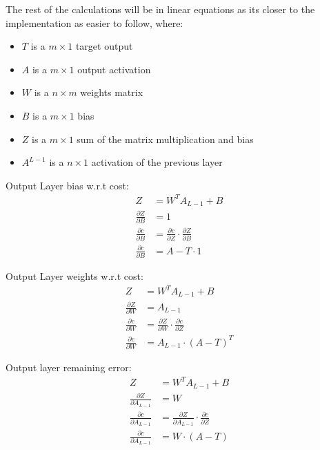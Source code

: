 The rest of the calculations will be in linear equations as its closer to the
implementation as easier to follow, where:
\begin{itemize}
    \item \( T \) is a \( m \times 1 \) target output
    \item \( A \) is a  \( m \times 1 \) output activation
    \item \( W \) is a \( n \times m \) weights matrix
    \item \( B \) is a \( m \times 1 \) bias
    \item \( Z \) is a \( m \times 1 \) sum of the matrix multiplication and bias
    \item \(A^{L-1} \) is a \( n \times 1 \) activation of the previous layer
\end{itemize}

Output Layer bias w.r.t cost:
\begin{equation}
    \begin{aligned}
        Z &= W^{T}A_{L-1} + B\\
        \frac{\partial Z}{\partial B} &= 1\\[2em]
        \frac{\partial c}{\partial B} &= \frac{\partial c}{\partial Z} \cdot \frac{\partial Z}{\partial B}\\
        \frac{\partial c}{\partial B} &= A - T \cdot 1
    \end{aligned}
\end{equation}

Output Layer weights w.r.t cost:
\begin{equation}
    \begin{aligned}
        Z &= W^{T}A_{L-1} + B\\
        \frac{\partial Z}{\partial W} &= A_{L-1}\\[2em]
        \frac{\partial c}{\partial W} &= \frac{\partial Z}{\partial W} \cdot \frac{\partial c}{\partial Z} \\
        \frac{\partial c}{\partial W} &= A_{L-1} \cdot (A - T)^{T}
    \end{aligned}
\end{equation}

Output layer remaining error:
\begin{equation}
    \begin{aligned}
        Z &= W^{T}A_{L-1} + B\\
        \frac{\partial Z}{\partial A_{L-1}} &= W\\[2em]
        \frac{\partial c}{\partial A_{L-1}} &= \frac{\partial Z}{\partial A_{L-1}} \cdot \frac{\partial c}{\partial Z}\\
        \frac{\partial c}{\partial A_{L-1}} &= W \cdot (A - T)
    \end{aligned}
\end{equation}

